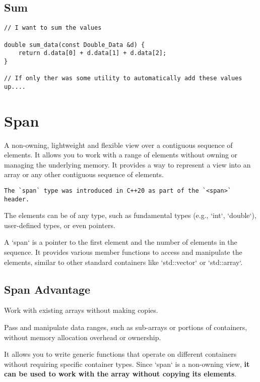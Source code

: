 \documentclass[openany]{report}
\begin{document}
\subsection{Sum}

\begin{verbatim}
// I want to sum the values

double sum_data(const Double_Data &d) {
    return d.data[0] + d.data[1] + d.data[2];
}

// If only ther was some utility to automatically add these values up....
\end{verbatim}

\section{Span}

A non-owning, lightweight and flexible view over a contiguous sequence of elements. It allows you to work with a range of elements without owning or managing the underlying memory.
It provides a way to represent a view into an array or any other contiguous sequence of elements. 

\begin{verbatim}
The `span` type was introduced in C++20 as part of the `<span>` header. 
\end{verbatim}

The elements can be of any type, such as fundamental types (e.g., `int`, `double`), user-defined types,
or even pointers.

A `span` is a pointer to the first element and the number of elements in the sequence.
It provides various member functions to access and manipulate the elements,
similar to other standard containers like `std::vector` or `std::array`.

\subsection{Span Advantage}

Work with existing arrays without making copies.

Pass and manipulate data ranges, such as sub-arrays or portions of containers,
without memory allocation overhead or ownership.

It allows you to write generic functions that operate on different containers
without requiring specific container types.
Since `span` is a non-owning view, \textbf{it can be used to work with the array without copying its elements}.
\end{document}
